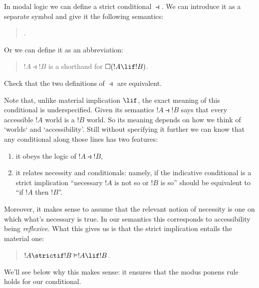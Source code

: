\documentclass[../../../include/open-logic-section]{subfiles}
\begin{document}


In modal logic we can define a strict conditional $\strictif$. We can introduce it as a separate symbol and give it the following semantics:

\begin{quote}
.
\end{quote}


Or we can define it as an abbreviation:

\begin{quote}
$!A \strictif !B$ is a shorthand for $\Box(!A \lif !B)$.
\end{quote}

\begin{prob}
Check that the two definitions of $\strictif$ are equivalent.
\end{prob}

Note that, unlike material implication $\lif$, the exact meaning of this conditional is underspecified. Given its semantics $!A \strictif !B$ says that every accessible $!A$ world is a $!B$ world. So its meaning depends on how we think of `worlds` and `accessibility'. Still without specifying it further we can know that any conditional along those lines has two features:

\begin{enumerate}
	\item it obeys the logic of $!A \strictif !B$,
	\item it relates necessity and conditionals: namely, if the indicative conditional is a strict implication ``necessary $!A$ is not so or $!B$ is so'' should be equivalent to ``if $!A$ then $!B$''.
\end{enumerate}

Moreover, it makes sense to assume that the relevant notion of necessity is one on which what's necessary is true. In our semantics this corresponds to accessibility being \emph{reflexive}. What this gives us is that the strict implication entails the material one:

\begin{quotation}
$!A \strictif !B \Entails !A \lif !B$.
\end{quotation}

We'll see below why this makes sense: it ensures that the modus ponens rule holds for our conditional.
\end{document}
